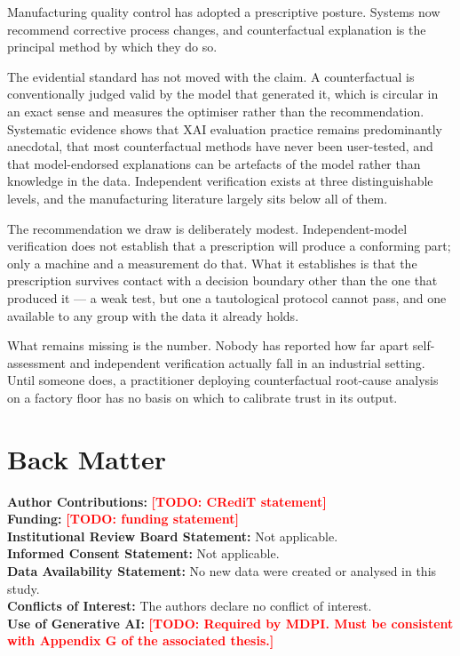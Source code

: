 \documentclass[11pt,a4paper]{article}
\newcommand{\TODO}[1]{\textcolor{red}{\textbf{[TODO: #1]}}}
\begin{document}
Manufacturing quality control has adopted a prescriptive posture. Systems now recommend corrective process changes, and counterfactual explanation is the principal method by which they do so.

The evidential standard has not moved with the claim. A counterfactual is conventionally judged valid by the model that generated it, which is circular in an exact sense and measures the optimiser rather than the recommendation. Systematic evidence shows that XAI evaluation practice remains predominantly anecdotal, that most counterfactual methods have never been user-tested, and that model-endorsed explanations can be artefacts of the model rather than knowledge in the data. Independent verification exists at three distinguishable levels, and the manufacturing literature largely sits below all of them.

The recommendation we draw is deliberately modest. Independent-model verification does not establish that a prescription will produce a conforming part; only a machine and a measurement do that. What it establishes is that the prescription survives contact with a decision boundary other than the one that produced it --- a weak test, but one a tautological protocol cannot pass, and one available to any group with the data it already holds.

What remains missing is the number. Nobody has reported how far apart self-assessment and independent verification actually fall in an industrial setting. Until someone does, a practitioner deploying counterfactual root-cause analysis on a factory floor has no basis on which to calibrate trust in its output.

\section*{Back Matter}

\noindent\textbf{Author Contributions:} \TODO{CRediT statement}\\
\textbf{Funding:} \TODO{funding statement}\\
\textbf{Institutional Review Board Statement:} Not applicable.\\
\textbf{Informed Consent Statement:} Not applicable.\\
\textbf{Data Availability Statement:} No new data were created or analysed in this study.\\
\textbf{Conflicts of Interest:} The authors declare no conflict of interest.\\
\textbf{Use of Generative AI:} \TODO{Required by MDPI. Must be consistent with Appendix G of the associated thesis.}
\end{document}
